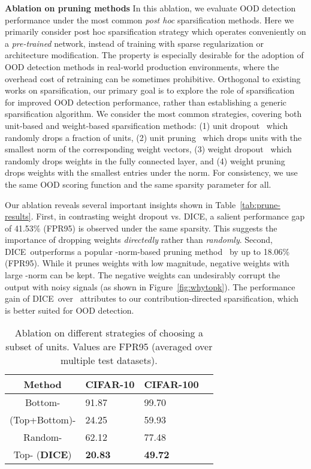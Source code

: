 \documentclass[runningheads]{llncs}
\newcommand{\methodAbbr}{DICE~}
\begin{document}
\noindent \textbf{Ablation on  pruning methods} In this ablation, we evaluate OOD detection performance under the most common \emph{post hoc} sparsification methods. Here we primarily consider {post hoc} sparsification strategy which
operates conveniently on a \emph{pre-trained} network, instead of training with sparse regularization or architecture modification. The property is especially desirable for the adoption of OOD detection methods in real-world production environments, where the overhead cost of retraining can be sometimes prohibitive.   Orthogonal to existing works on sparsification, our primary goal is to explore the role of sparsification for improved  OOD detection performance, {rather than establishing a generic sparsification algorithm}. We consider the most common strategies, covering both unit-based and weight-based sparsification methods: (1) {unit dropout}~\cite{Nitish2014dropout} which randomly drops a fraction of units, (2) {unit pruning}~\cite{Hao2017pruneUnit} which
drops units with the smallest  norm of the corresponding weight vectors, (3) {weight dropout}~\cite{Wan2013weightdropout} which randomly drops weights in the fully connected layer, and (4) {weight pruning}~\cite{Han2015prune} drops weights with the smallest entries under the  norm. For consistency, we use the same OOD scoring function and the same sparsity parameter for all. 




Our ablation reveals several important insights shown in Table~\ref{tab:prune-results}. 
First, in contrasting weight dropout vs. DICE, a salient performance gap of {41.53}\% (FPR95) is observed under the same sparsity. This suggests the importance of dropping weights \emph{directedly} rather than \emph{randomly}. Second, \methodAbbr outperforms a popular -norm-based pruning method~\cite{Han2015prune} by up to {18.06}\% (FPR95). While it prunes weights with low magnitude, negative weights with large -norm can be kept. The negative weights can undesirably corrupt the output with noisy signals (as shown in Figure~\ref{fig:whytopk}). The performance gain of \methodAbbr over~\cite{Han2015prune} attributes to our contribution-directed sparsification, which is better suited for OOD detection. 


\begin{table}
    \caption{\small Ablation on different strategies of choosing a subset of units.  Values are FPR95 (averaged over multiple test datasets).}
    \centering
        \begin{tabular}{c|lll}
        \toprule
        Method  & CIFAR-10\textbf{} & CIFAR-100 \textbf{}\\
        \midrule
         Bottom- & 91.87 & 99.70 \\
         (Top+Bottom)-  & 24.25 & 59.93\\
          Random- & 62.12 & 77.48 \\
         Top- (\textbf{DICE}) & \textbf{20.83} & \textbf{49.72} \\
         \bottomrule
        \end{tabular}
    \label{tab:topbot}
\end{table}
\end{document}
